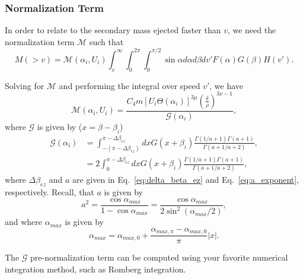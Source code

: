 \documentclass{hitec}
\numberwithin{equation}{section}
\begin{document}
\subsubsection{Normalization Term}

In order to relate to the secondary mass ejected faster than $v$, we need the normalization term $\mathcal{M}$ such that
\begin{equation}
M(>v) = \mathcal{M}(\alpha_i, U_i)\int_{v}^{\infty}\int_{0}^{2\pi}\int_{0}^{\pi/2}\sin\alpha d\alpha d\beta dv' F(\alpha)G(\beta)H(v').
\end{equation}

Solving for $\mathcal{M}$ and performing the integral over speed $v'$, we have
\begin{equation}\label{eq:M_norm_term_1}
\mathcal{M}(\alpha_i, U_i) = \frac{C_4 m [U_i\Theta(\alpha_i)]^{3\mu}\left(\frac{\delta}{\rho}\right)^{3\nu-1}}{\mathcal{G}(\alpha_i)},
\end{equation}
where $\mathcal{G}$ is given by ($x = \beta-\beta_i$)
\begin{align}
\mathcal{G}(\alpha_i) &= \int_{-(\pi-\Delta\beta_{ez})}^{\pi-\Delta\beta_{ez}}dx G(x+\beta_i)\frac{\Gamma(1/a+1)\Gamma(a+1)}{\Gamma(a+1/a+2)},\\
&=2\int_{0}^{\pi-\Delta\beta_{ez}}dx G(x+\beta_i)\frac{\Gamma(1/a+1)\Gamma(a+1)}{\Gamma(a+1/a+2)},
\end{align}
where $\Delta\beta_{ez}$ and $a$ are given in Eq.\ \eqref{eq:delta_beta_ez} and Eq.\ \eqref{eq:a_exponent}, respectively. Recall, that $a$ is given by
\begin{equation}
a^2 = \frac{\cos\alpha_{max}}{1-\cos\alpha_{max}} = \frac{\cos\alpha_{max}}{2\sin^2(\alpha_{max}/2)},
\end{equation}
and where $\alpha_{max}$ is given by
\begin{equation}
\alpha_{max} = \alpha_{max,0} + \frac{\alpha_{max,\pi} - \alpha_{max,0}}{\pi}|x|.
\end{equation}

The $\mathcal{G}$ pre-normalization term can be computed using your favorite numerical integration method, such as Romberg integration.
 
\end{document}

